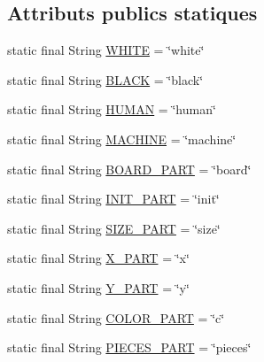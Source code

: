 \subsection*{Attributs publics statiques}
\begin{DoxyCompactItemize}
\item 
static final String \hyperlink{interfacecom_1_1publisher_1_1BoardPublisher_a4cc34fc55d558d4d567bb4835faca1cb}{W\-H\-I\-T\-E} = \char`\"{}white\char`\"{}
\item 
static final String \hyperlink{interfacecom_1_1publisher_1_1BoardPublisher_aba94dc86e361ca79b6837d7be045a9a8}{B\-L\-A\-C\-K} = \char`\"{}black\char`\"{}
\item 
static final String \hyperlink{interfacecom_1_1publisher_1_1BoardPublisher_aa1f69b7f88b84c429507c8e1a1a05dfc}{H\-U\-M\-A\-N} = \char`\"{}human\char`\"{}
\item 
static final String \hyperlink{interfacecom_1_1publisher_1_1BoardPublisher_a129aef59c73a473f569518604209f9a5}{M\-A\-C\-H\-I\-N\-E} = \char`\"{}machine\char`\"{}
\item 
static final String \hyperlink{interfacecom_1_1publisher_1_1BoardPublisher_a92afdb8fe43445ae26666c639e029947}{B\-O\-A\-R\-D\-\_\-\-P\-A\-R\-T} = \char`\"{}board\char`\"{}
\item 
static final String \hyperlink{interfacecom_1_1publisher_1_1BoardPublisher_a4284ddedaea2e3e014c275c71b630151}{I\-N\-I\-T\-\_\-\-P\-A\-R\-T} = \char`\"{}init\char`\"{}
\item 
static final String \hyperlink{interfacecom_1_1publisher_1_1BoardPublisher_adee2a9754672ab7fa9c7444670675652}{S\-I\-Z\-E\-\_\-\-P\-A\-R\-T} = \char`\"{}size\char`\"{}
\item 
static final String \hyperlink{interfacecom_1_1publisher_1_1BoardPublisher_a2b1aa577a5813b50376be3b43b673871}{X\-\_\-\-P\-A\-R\-T} = \char`\"{}x\char`\"{}
\item 
static final String \hyperlink{interfacecom_1_1publisher_1_1BoardPublisher_a9a0cac8873d240fbeac51b8b9d63c989}{Y\-\_\-\-P\-A\-R\-T} = \char`\"{}y\char`\"{}
\item 
static final String \hyperlink{interfacecom_1_1publisher_1_1BoardPublisher_a1b9e7130f674f96f073a47a31c6f7f7a}{C\-O\-L\-O\-R\-\_\-\-P\-A\-R\-T} = \char`\"{}c\char`\"{}
\item 
static final String \hyperlink{interfacecom_1_1publisher_1_1BoardPublisher_aa1c1d112ea8a987b5b6c75977b1c8f62}{P\-I\-E\-C\-E\-S\-\_\-\-P\-A\-R\-T} = \char`\"{}pieces\char`\"{}
\item 

\end{DoxyCompactItemize}
